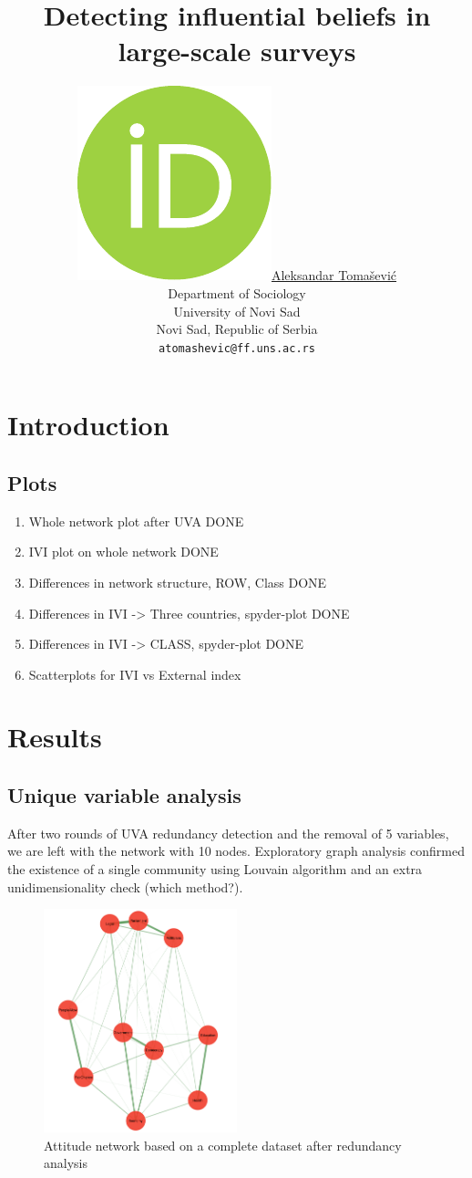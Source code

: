 \documentclass{article}
\title{Detecting influential beliefs in large-scale surveys}
\author{ \href{https://orcid.org/0000-0003-4863-6051}{\includegraphics[scale=0.06]{orcid.pdf}\hspace{1mm}Aleksandar Tomašević} \\
	Department of Sociology\\
	University of Novi Sad\\
	Novi Sad, Republic of Serbia\\
	\texttt{atomashevic@ff.uns.ac.rs}
}
\begin{document}
\maketitle

\section{Introduction}

\subsection{Plots}

\begin{enumerate}
	\item Whole network plot after UVA DONE
	\item IVI plot on whole network DONE
	\item Differences in network structure, ROW, Class DONE
	\item Differences in IVI -> Three countries, spyder-plot DONE
	\item Differences in IVI -> CLASS, spyder-plot  DONE
	\item Scatterplots for IVI vs External index
\end{enumerate}

\newpage
\section{Results}
\subsection{Unique variable analysis}

After two rounds of UVA redundancy detection
and the removal of 5 variables, we are left with the network with 10 nodes. Exploratory graph analysis confirmed the existence of a single community using Louvain algorithm and an extra unidimensionality check (which method?).

\begin{figure}[ht]
	\centering
	\label{fig:egafull}
	\includegraphics[width=0.5\textwidth]{figures/01-ega-full.png}
	\caption{Attitude network based on a complete dataset after redundancy analysis}
\end{figure}
\end{document}
